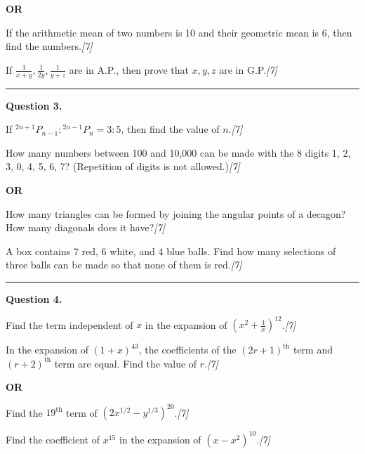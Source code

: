 \documentclass[11pt,a4paper]{article}
\newcommand{\pts}[1]{\hfill   \textit{[#1]}}
\begin{document}
\centerline{   \textbf{OR}}


\begin{parts}
  \item If the arithmetic mean of two numbers is 10 and their geometric mean is 6, then find the numbers.\pts{7}
  \item If $\frac{1}{x+y}, \frac{1}{2y}, \frac{1}{y+z}$ are in A.P., then prove that $x, y, z$ are in G.P.\pts{7}
\end{parts}

\medskip\rule{\linewidth}{0.2pt}

\pagebreak




\noindent   \textbf{Question 3.}

\begin{parts}
  \item If ${}^{2n+1}P_{n-1} : {}^{2n-1}P_n = 3:5$, then find the value of $n$.\pts{7}
  \item How many numbers between 100 and 10,000 can be made with the 8 digits 1, 2, 3, 0, 4, 5, 6, 7? (Repetition of digits is not allowed.)\pts{7}
\end{parts}

\centerline{   \textbf{OR}}


\begin{parts}
  \item How many triangles can be formed by joining the angular points of a decagon? How many diagonals does it have?\pts{7}
  \item A box contains 7 red, 6 white, and 4 blue balls. Find how many selections of three balls can be made so that none of them is red.\pts{7}
\end{parts}

\medskip\rule{\linewidth}{0.2pt}




\noindent   \textbf{Question 4.}

\begin{parts}
  \item Find the term independent of $x$ in the expansion of $\left(x^2 + \frac{1}{x}\right)^{12}$.\pts{7}
  \item In the expansion of $(1 + x)^{43}$, the coefficients of the $(2r + 1)^{ \text{th}}$ term and $(r + 2)^{ \text{th}}$ term are equal. Find the value of $r$.\pts{7}
\end{parts}

\centerline{   \textbf{OR}}


\begin{parts}
  \item Find the $19^{ \text{th}}$ term of $\left(2x^{1/2} - y^{1/3}\right)^{20}$.\pts{7}
  \item Find the coefficient of $x^{15}$ in the expansion of $(x - x^2)^{10}$.\pts{7}
\end{parts}
\end{document}
